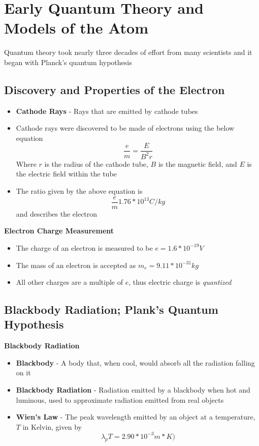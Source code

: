 \section{Early Quantum Theory and Models of the Atom}
Quantum theory took nearly three decades of effort from many scientists and it began with Planck's quantum hypothesis

\subsection{Discovery and Properties of the Electron}
\begin{itemize}
    \item \textbf{Cathode Rays} - Rays that are emitted by cathode tubes
    \item Cathode rays were discovered to be made of electrons using the below equation \[\frac{e}{m}=\frac{E}{B^2r}\] Where \(r\) is the radius of the cathode tube, \(B\) is the magnetic field, and \(E\) is the electric field within the tube
    \item The ratio given by the above equation is \[\frac{e}{m}1.76*10^{13}C/kg\] and describes the electron
\end{itemize}

\textbf{Electron Charge Measurement}
\begin{itemize}
    \item The charge of an electron is measured to be \(e=1.6*10^{-19}V\)
    \item The mass of an electron is accepted as \(m_e=9.11*10^{-31}kg\)
    \item All other charges are a multiple of \(e\), thus electric charge is \emph{quantized}
\end{itemize}

\subsection{Blackbody Radiation; Plank's Quantum Hypothesis}
\textbf{Blackbody Radiation}
\begin{itemize}
    \item \textbf{Blackbody} - A body that, when cool, would absorb all the radiation falling on it
    \item \textbf{Blackbody Radiation} - Radiation emitted by a blackbody when hot and luminous, used to approximate radiation emitted from real objects
    \item \textbf{Wien's Law} - The peak wavelength emitted by an object at a temperature, \(T\) in Kelvin, given by \[\lambda_pT=2.90*10^{-3}m*K)\]
\end{itemize}


